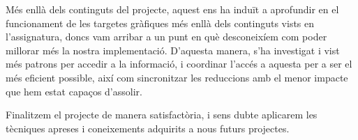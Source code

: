 \documentclass[catalan,10pt,a4paper]{article}
\begin{document}
Més enllà dels continguts del projecte, aquest ens ha induït a aprofundir en el funcionament de les targetes gràfiques més enllà dels continguts vists en l'assignatura, doncs vam arribar a un punt en què desconeixíem com poder millorar més la nostra implementació. D'aquesta manera, s'ha investigat i vist més patrons per accedir a la informació, i coordinar l'accés a aquesta per a ser el més eficient possible, així com sincronitzar les reduccions amb el menor impacte que hem estat capaços d'assolir.

Finalitzem el projecte de manera satisfactòria, i sens dubte aplicarem les tècniques apreses i coneixements adquirits a nous futurs projectes.


\newpage


\end{document}
